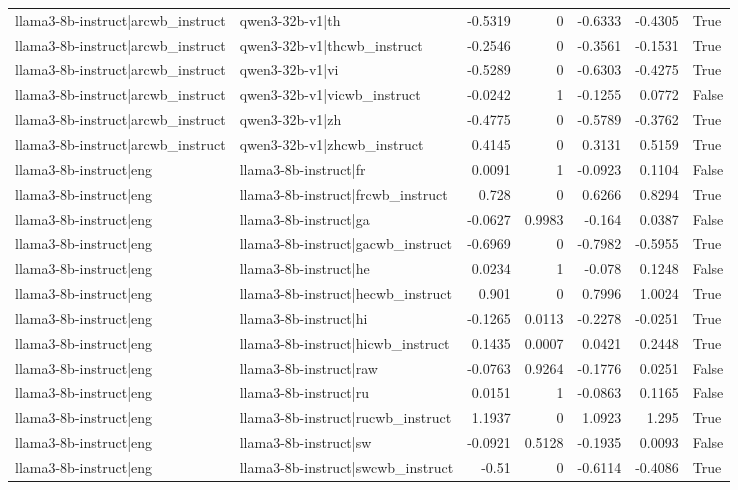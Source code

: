 \begin{table}
\begin{tabular}{l l r r r r l}
llama3-8b-instruct|arcwb_instruct & qwen3-32b-v1|th & -0.5319 & 0 & -0.6333 & -0.4305 & True \\
llama3-8b-instruct|arcwb_instruct & qwen3-32b-v1|thcwb_instruct & -0.2546 & 0 & -0.3561 & -0.1531 & True \\
llama3-8b-instruct|arcwb_instruct & qwen3-32b-v1|vi & -0.5289 & 0 & -0.6303 & -0.4275 & True \\
llama3-8b-instruct|arcwb_instruct & qwen3-32b-v1|vicwb_instruct & -0.0242 & 1 & -0.1255 & 0.0772 & False \\
llama3-8b-instruct|arcwb_instruct & qwen3-32b-v1|zh & -0.4775 & 0 & -0.5789 & -0.3762 & True \\
llama3-8b-instruct|arcwb_instruct & qwen3-32b-v1|zhcwb_instruct & 0.4145 & 0 & 0.3131 & 0.5159 & True \\
llama3-8b-instruct|eng & llama3-8b-instruct|fr & 0.0091 & 1 & -0.0923 & 0.1104 & False \\
llama3-8b-instruct|eng & llama3-8b-instruct|frcwb_instruct & 0.728 & 0 & 0.6266 & 0.8294 & True \\
llama3-8b-instruct|eng & llama3-8b-instruct|ga & -0.0627 & 0.9983 & -0.164 & 0.0387 & False \\
llama3-8b-instruct|eng & llama3-8b-instruct|gacwb_instruct & -0.6969 & 0 & -0.7982 & -0.5955 & True \\
llama3-8b-instruct|eng & llama3-8b-instruct|he & 0.0234 & 1 & -0.078 & 0.1248 & False \\
llama3-8b-instruct|eng & llama3-8b-instruct|hecwb_instruct & 0.901 & 0 & 0.7996 & 1.0024 & True \\
llama3-8b-instruct|eng & llama3-8b-instruct|hi & -0.1265 & 0.0113 & -0.2278 & -0.0251 & True \\
llama3-8b-instruct|eng & llama3-8b-instruct|hicwb_instruct & 0.1435 & 0.0007 & 0.0421 & 0.2448 & True \\
llama3-8b-instruct|eng & llama3-8b-instruct|raw & -0.0763 & 0.9264 & -0.1776 & 0.0251 & False \\
llama3-8b-instruct|eng & llama3-8b-instruct|ru & 0.0151 & 1 & -0.0863 & 0.1165 & False \\
llama3-8b-instruct|eng & llama3-8b-instruct|rucwb_instruct & 1.1937 & 0 & 1.0923 & 1.295 & True \\
llama3-8b-instruct|eng & llama3-8b-instruct|sw & -0.0921 & 0.5128 & -0.1935 & 0.0093 & False \\
llama3-8b-instruct|eng & llama3-8b-instruct|swcwb_instruct & -0.51 & 0 & -0.6114 & -0.4086 & True \\

\end{tabular}
\end{table}
